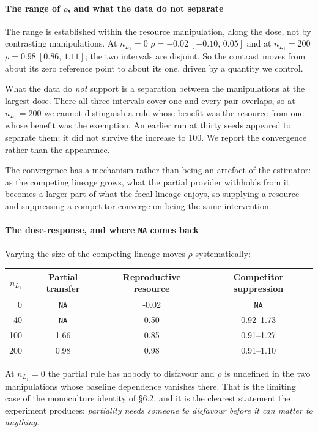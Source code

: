\paragraph{The range of \texorpdfstring{$\rho$}{rho}, and what the data do not separate}
The range is established within the resource manipulation, along the
dose, not by contrasting manipulations. At $n_{L_1}=0$
$\rho=-0.02~[-0.10,\,0.05]$ and at $n_{L_1}=200$
$\rho=0.98~[0.86,\,1.11]$; the two intervals are disjoint.
So the contrast moves from about its zero reference point to about its
one, driven by a quantity we control.

What the data do \emph{not} support is a separation between the
manipulations at the largest dose. There all three intervals cover one and every pair overlaps, so at
$n_{L_1}=200$ we cannot distinguish a rule whose benefit
was the resource from one whose benefit was the exemption. An
earlier run at thirty seeds appeared to separate them; it did not
survive the increase to 100. We report the
convergence rather than the appearance.

The convergence has a mechanism rather than being an artefact of the
estimator: as the competing lineage grows, what the partial provider
withholds from it becomes a larger part of what the focal lineage
enjoys, so supplying a resource and suppressing a competitor converge
on being the same intervention.

\paragraph{The dose-response, and where \texorpdfstring{\texttt{NA}}{NA} comes back}
Varying the size of the competing lineage moves $\rho$ systematically:
\begin{center}\small
\begin{tabular}{rccc}
\toprule
$n_{L_1}$ & Partial transfer & Reproductive resource & Competitor suppression\\
\midrule
0 & \texttt{NA} & -0.02 & \texttt{NA}\\
40 & \texttt{NA} & 0.50 & 0.92--1.73\\
100 & 1.66 & 0.85 & 0.91--1.27\\
200 & 0.98 & 0.98 & 0.91--1.10\\
\bottomrule
\end{tabular}
\end{center}

At $n_{L_1}=0$ the partial rule has nobody to disfavour and $\rho$ is
undefined in the two manipulations whose baseline dependence vanishes
there. That is the limiting case of the monoculture identity of \S6.2,
and it is the clearest statement the experiment produces:
\emph{partiality needs someone to disfavour before it can matter to
anything}.

